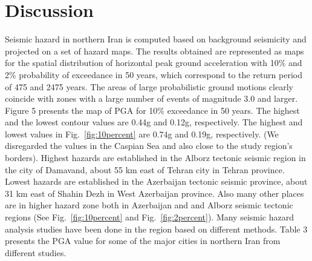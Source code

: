 
\section{Discussion}

Seismic hazard in northern Iran is computed based on background seismicity and projected on a set of hazard maps. The results obtained are represented as maps for the spatial distribution of horizontal peak ground acceleration with 10\% and 2\% probability of exceedance in 50 years, which correspond to the return period of 475 and 2475 years. The areas of large probabilistic ground motions clearly coincide with zones with a large number of events of magnitude 3.0 and larger. Figure 5 presents the map of PGA for 10\% exceedance in 50 years. The highest and the lowest contour values are 0.44g and 0.12g, respectively. The highest and lowest values in Fig.~\ref{fig:10percent} are 0.74g and 0.19g, respectively. (We disregarded the values in the Caspian Sea and also close to the study region's borders). Highest hazards are established in the Alborz tectonic seismic region in the city of Damavand, about 55 km east of Tehran city in Tehran province. Lowest hazards are established in the Azerbaijan tectonic seismic province, about 31 km east of Shahin Dezh in West Azerbaijan province. Also many other places are in higher hazard zone both in Azerbaijan and and Alborz seismic tectonic regions (See Fig.~\ref{fig:10percent} and Fig.~\ref{fig:2percent}). Many seismic hazard analysis studies have been done in the region based on different methods. Table 3 presents the PGA value for some of the major cities in northern Iran from different studies.

